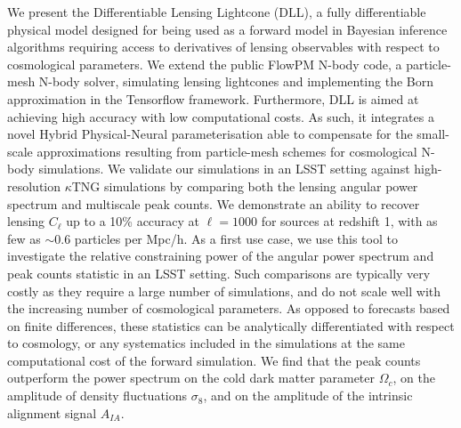 \documentclass{aa}
\begin{document}
  \abstract
   {}
   {We present the Differentiable Lensing Lightcone (DLL), a fully differentiable physical model designed for being used as a forward model in Bayesian inference algorithms requiring access to derivatives of lensing observables with respect to cosmological parameters. 
}
   {We extend the public FlowPM N-body code, a particle-mesh N-body solver, simulating lensing lightcones and implementing the Born approximation in the Tensorflow framework. Furthermore, DLL is aimed at achieving high accuracy with low computational costs. As such, it integrates a novel Hybrid Physical-Neural parameterisation able to compensate for the small-scale approximations resulting from particle-mesh schemes for cosmological N-body simulations.
We validate our simulations in an LSST setting against high-resolution $\kappa$TNG simulations by comparing both the lensing angular power spectrum and multiscale peak counts. We demonstrate an ability to recover lensing $C_\ell$ up to a 10\% accuracy at $\ell=1000$ for sources at redshift 1, with as few as $\sim 0.6$ particles per Mpc/h. 
As a first use case, we use this tool to investigate the relative constraining power of the angular power spectrum and peak counts statistic in an LSST setting.
Such comparisons are typically very costly as they require a large number of simulations, and do not scale well with the increasing number of cosmological parameters.  
As opposed to forecasts based on finite differences, these statistics can be analytically differentiated with respect to cosmology, or any systematics included in the simulations at the same computational cost of the forward simulation. }
   {We find that the peak counts outperform the power spectrum on the cold dark matter parameter $\Omega_c$, on the amplitude of density fluctuations $\sigma_8$, and on the
amplitude of the intrinsic alignment signal $A_{IA}$.}
   {}


\maketitle
%
\end{document}
